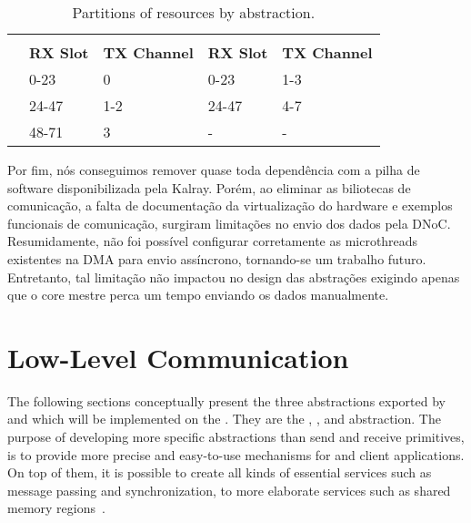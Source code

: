 		\begin{table}[!tb]
			\centering%
			\caption{Partitions of \noc resources by abstraction.}%
			\label{tab.noc-resources}%

			\begin{tabular}{l|l|l|l|l|}
				\cline{2-5}
														& \multicolumn{2}{c|}{\textbf{\cnoc}}    & \multicolumn{2}{c|}{\textbf{\dnoc}}    \\ \cline{2-5}
														& \textbf{RX Slot} & \textbf{TX Channel} & \textbf{RX Slot} & \textbf{TX Channel} \\ \hline
				\multicolumn{1}{|l|}{\textbf{\mailbox}} & 0-23             & 0                   & 0-23             & 1-3                 \\ \hline
				\multicolumn{1}{|l|}{\textbf{\portal}}  & 24-47            & 1-2                 & 24-47            & 4-7                 \\ \hline
				\multicolumn{1}{|l|}{\textbf{\sync}}    & 48-71            & 3                   & -                & -                   \\ \hline
			\end{tabular}

		\end{table}

		Por fim, nós conseguimos remover quase toda dependência com a pilha de software disponibilizada pela Kalray.
		Porém, ao eliminar as biliotecas de comunicação, a falta de documentação da virtualização do hardware e exemplos funcionais de comunicação, surgiram limitações no envio dos dados pela DNoC.
		Resumidamente, não foi possível configurar corretamente as microthreads existentes na DMA para envio assíncrono, tornando-se um trabalho futuro.
		Entretanto, tal limitação não impactou no design das abstrações exigindo apenas que o core mestre perca um tempo enviando os dados manualmente.

	\section{Low-Level Communication}
	\label{sec.low-level-comm}

		The following sections conceptually present the three abstractions
		exported by \hal and which will be implemented on the \mppa.
		They are the \sync, \mailbox, and \portal abstraction.
		The purpose of developing more specific abstractions than
		send and receive primitives, is to provide more precise and easy-to-use
		mechanisms for \os and client applications.
		On top of them, it is possible to create all kinds of essential
		services such as message passing and synchronization,
		to more elaborate services such as shared memory regions~\cite{penna:rmen}.

